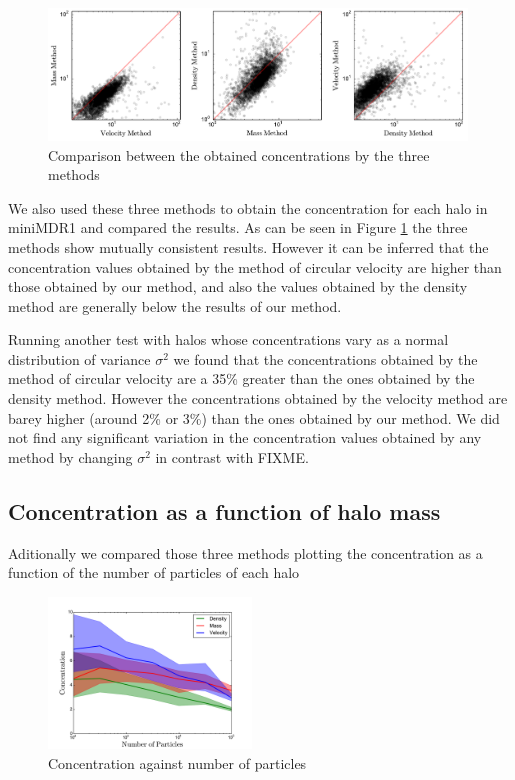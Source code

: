 \documentclass[useAMS,usenatbib]{mn2e}
\begin{document}
\begin{figure}
\begin{center}
  \includegraphics[width=0.99\textwidth]{mass-density-velocity.pdf}
\end{center}
\caption{Comparison between the obtained concentrations by the three methods
    \label{fig:mdv}}
\end{figure}

We also used these three methods to obtain the concentration for each halo in miniMDR1 and compared the results. As can be seen in Figure \ref{fig:mdv} the three methods show mutually consistent results. However it can be inferred that the concentration values ​​obtained by the method of circular velocity are higher than those obtained by our method, and also the values ​​obtained by the density method are generally below the results of our method.

Running another test with halos whose concentrations vary as a normal distribution of variance ${\sigma}^2$ we found that the concentrations obtained by the method of circular velocity are a 35\% greater than the ones obtained by the density method. However the concentrations obtained by the velocity method are barey higher (around 2\% or 3\%) than the ones obtained by our method. We did not find any significant variation in the concentration values obtained by any method by changing ${\sigma}^2$ in contrast with FIXME.

\subsection{Concentration as a function of halo mass}
Aditionally we compared those three methods plotting the concentration as a function of the number of particles of each halo 

\begin{figure}[h!]
\begin{center}
  \includegraphics[width=0.48\textwidth]{concentration.pdf}
\end{center}
\caption{Concentration against number of particles
    \label{fig:concentrations}}
\end{figure}
\end{document}
